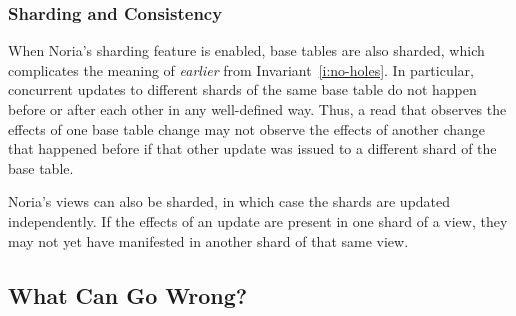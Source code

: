 %
%
%

\subsubsection*{Sharding and Consistency}

When Noria's sharding feature is enabled, base tables are also sharded, which
complicates the meaning of \emph{earlier} from
Invariant~\ref{i:no-holes}. In particular, concurrent updates to different
shards of the same base table do not happen before or after each other in any
well-defined way. Thus, a read that observes the effects of one base table
change may not observe the effects of another change that happened before if
that other update was issued to a different shard of the base table.

Noria's views can also be sharded, in which case the shards are updated
independently. If the effects of an update are present in one shard of a view,
they may not yet have manifested in another shard of that same view.

\subsection{What Can Go Wrong?}

